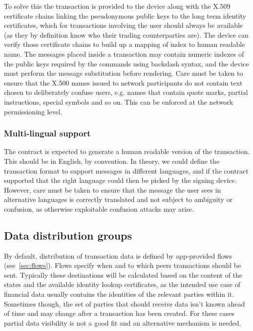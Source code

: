 \documentclass{article}
\begin{document}
To solve this the transaction is provided to the device along with the X.509 certificate chains linking the
pseudonymous public keys to the long term identity certificates, which for transactions involving the user should
always be available (as they by definition know who their trading counterparties are). The device can verify those
certificate chains to build up a mapping of index to human readable name. The messages placed inside a transaction
may contain numeric indexes of the public keys required by the commands using backslash syntax, and the device must
perform the message substitution before rendering. Care must be taken to ensure that the X.500 names issued to
network participants do not contain text chosen to deliberately confuse users, e.g. names that contain quote marks,
partial instructions, special symbols and so on. This can be enforced at the network permissioning level.

\subsubsection{Multi-lingual support}

The contract is expected to generate a human readable version of the transaction. This should be in English, by
convention. In theory, we could define the transaction format to support messages in different languages, and if
the contract supported that the right language could then be picked by the signing device. However, care must be
taken to ensure that the message the user sees in alternative languages is correctly translated and not subject to
ambiguity or confusion, as otherwise exploitable confusion attacks may arise.

\subsection{Data distribution groups}

By default, distribution of transaction data is defined by app-provided flows (see~\cref{sec:flows}). Flows specify
when and to which peers transactions should be sent. Typically these destinations will be calculated based on the
content of the states and the available identity lookup certificates, as the intended use case of financial data
usually contains the identities of the relevant parties within it. Sometimes though, the set of parties that should
receive data isn't known ahead of time and may change after a transaction has been created. For these cases partial
data visibility is not a good fit and an alternative mechanism is needed.
\end{document}
